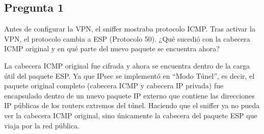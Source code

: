 \subsection{Pregunta 1}

Antes de configurar la VPN, el sniffer mostraba protocolo ICMP. Tras activar la VPN, el protocolo cambia a ESP (Protocolo 50). ¿Qué sucedió con la cabecera ICMP original y en qué parte del nuevo paquete se encuentra ahora?

\begin{respuesta}
    La cabecera ICMP original fue cifrada y ahora se encuentra dentro de la carga útil del paquete ESP. Ya que IPsec se implementó en ``Modo Túnel'', es decir, el paquete original completo (cabecera ICMP y cabecera IP privada) fue encapsulado dentro de un nuevo paquete IP externo que contiene las direcciones IP públicas de los routers extremos del túnel. Haciendo que el sniffer ya no pueda ver la cabecera ICMP original, sino únicamente la cabecera del paquete ESP que viaja por la red pública.
\end{respuesta}
